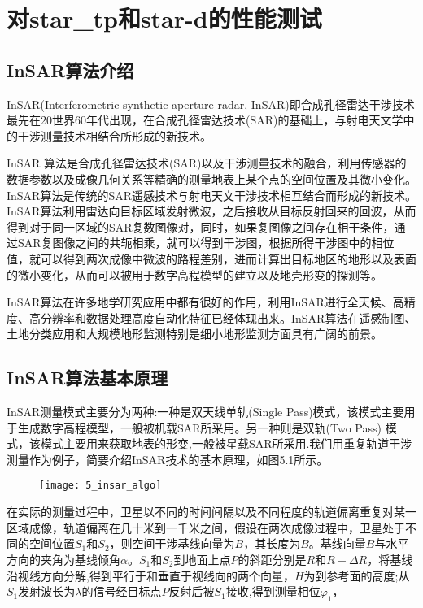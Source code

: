
\chapter{对star\_tp和star-d的性能测试}
\label{chap:InSAR5}

\section{InSAR算法介绍}

InSAR\citep{wu2008insar}(Interferometric synthetic aperture radar, InSAR)即合成孔径雷达干涉技术最先在20世界60年代出现，在合成孔径雷达技术(SAR)的基础上，与射电天文学中的干涉测量技术相结合所形成的新技术。

InSAR 算法是合成孔径雷达技术(SAR)以及干涉测量技术的融合，利用传感器的数据参数以及成像几何关系等精确的测量地表上某个点的空间位置及其微小变化。InSAR算法是传统的SAR遥感技术与射电天文干涉技术相互结合而形成的新技术。InSAR算法利用雷达向目标区域发射微波，之后接收从目标反射回来的回波，从而得到对于同一区域的SAR复数图像对，同时，如果复图像之间存在相干条件，通过SAR复图像之间的共轭相乘，就可以得到干涉图，根据所得干涉图中的相位值，就可以得到两次成像中微波的路程差别，进而计算出目标地区的地形以及表面的微小变化，从而可以被用于数字高程模型的建立以及地壳形变的探测等。

InSAR算法在许多地学研究应用中都有很好的作用，利用InSAR进行全天候、高精度、高分辨率和数据处理高度自动化特征已经体现出来。InSAR算法在遥感制图、土地分类应用和大规模地形监测特别是细小地形监测方面具有广阔的前景。 

\section{InSAR算法基本原理}

InSAR测量模式主要分为两种:一种是双天线单轨(Single Pass)模式，该模式主要用于生成数字高程模型，一般被机载SAR所采用。另一种则是双轨(Two Pass) 模式，该模式主要用来获取地表的形变,一般被星载SAR所采用.我们用重复轨道干涉测量作为例子，简要介绍InSAR技术的基本原理，如图5.1所示。

\begin{figure}[!htbp]
    \centering
    \texttt{[image: 5\_insar\_algo]}
    \label{fig:5_insar_algo}
\end{figure}
 
在实际的测量过程中，卫星以不同的时间间隔以及不同程度的轨道偏离重复对某一区域成像，轨道偏离在几十米到一千米之间，假设在两次成像过程中，卫星处于不同的空间位置$S_1$和$S_2$，则空间干涉基线向量为$B$，其长度为$B$。基线向量$B$与水平方向的夹角为基线倾角$\alpha$。$S_1$和$S_2$到地面上点$P$的斜距分别是$R$和$R+\Delta R$，将基线沿视线方向分解,得到平行于和垂直于视线向的两个向量，$H$为到参考面的高度;从$S_1$发射波长为$\lambda$的信号经目标点$P$反射后被$S_1$接收,得到测量相位$\varphi_1$，

